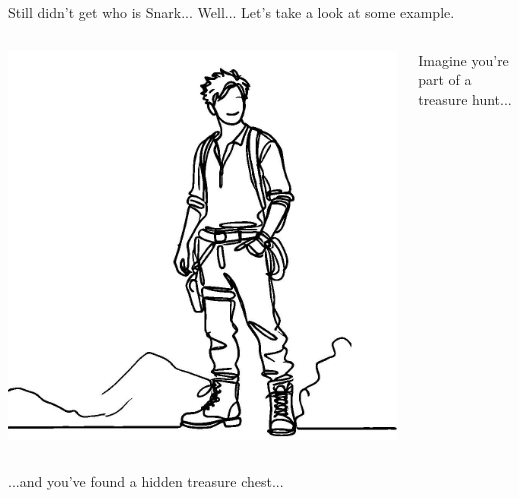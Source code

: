 \documentclass{beamer}
\begin{document}
    \begin{frame}{Still didn't get who is Snark...}
        Well... Let's take a look at some example. \pause

        \begin{columns}
            \begin{column}{0.2\textwidth}
                \includegraphics[width=\linewidth]{../presentations/images/lecture_8/urtreasurehunter.jpg}
            \end{column}
    
            \begin{column}{0.7\textwidth}
                Imagine you're part of a treasure hunt...
            \end{column}
        \end{columns}

        \pause

        \begin{columns}
            \begin{column}{0.7\textwidth}
                ...and you've found a hidden treasure chest...
            \end{column}


\end{columns}
\end{frame}
\end{document}
